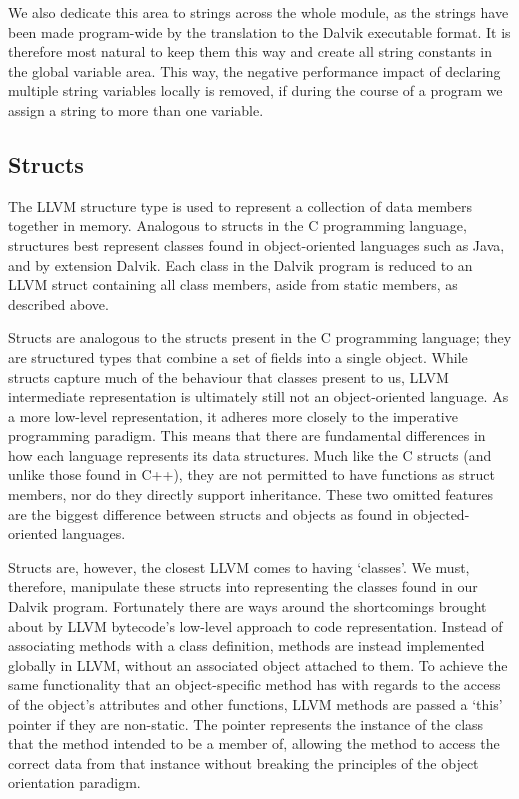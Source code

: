 We also dedicate this area to strings across the whole module, as the strings have been made program-wide by the translation to the Dalvik executable format. It is therefore most natural to keep them this way and create all string constants in the global variable area. This way, the negative performance impact of declaring multiple string variables locally is removed, if during the course of a program we assign a string to more than one variable.

\subsection*{Structs}

The LLVM structure type is used to represent a collection of data members together in memory. Analogous to structs in the C programming language, structures best represent classes found in object-oriented languages such as Java, and by extension Dalvik. Each class in the Dalvik program is reduced to an LLVM struct containing all class members, aside from static members, as described above.

Structs are analogous to the structs present in the C programming language; they are structured types that combine a set of fields into a single object. While structs capture much of the behaviour that classes present to us, LLVM intermediate representation is ultimately still not an object-oriented language. As a more low-level representation, it adheres more closely to the imperative programming paradigm. This means that there are fundamental differences in how each language represents its data structures. Much like the C structs (and unlike those found in C++), they are not permitted to have functions as struct members, nor do they directly support inheritance. These two omitted features are the biggest difference between structs and objects as found in objected-oriented languages.

Structs are, however, the closest LLVM comes to having `classes'. We must, therefore, manipulate these structs into representing the classes found in our Dalvik program. Fortunately there are ways around the shortcomings brought about by LLVM bytecode's low-level approach to code representation. Instead of associating methods with a class definition, methods are instead implemented globally in LLVM, without an associated object attached to them. To achieve the same functionality that an object-specific method has with regards to the access of the object's attributes and other functions, LLVM methods are passed a `this' pointer if they are non-static. The pointer represents the instance of the class that the method intended to be a member of, allowing the method to access the correct data from that instance without breaking the principles of the object orientation paradigm.

